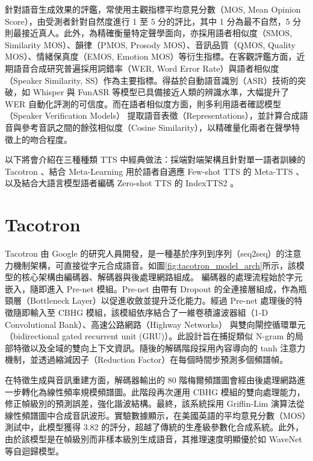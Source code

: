針對語音生成效果的評鑑，常使用主觀指標平均意見分數（MOS, Mean Opinion Score），由受測者針對自然度進行 1 至 5 分的評比，其中 1 分為最不自然，5 分則最接近真人。此外，為精確衡量特定聲學面向，亦採用語者相似度（SMOS, Similarity MOS）、韻律（PMOS, Prosody MOS）、音訊品質（QMOS, Quality MOS）、情緒保真度（EMOS, Emotion MOS）等衍生指標。在客觀評鑑方面，近期語音合成研究普遍採用詞錯率（WER, Word Error Rate）與語者相似度（Speaker Similarity, SS）作為主要指標。得益於自動語音識別（ASR）技術的突破，如 Whisper 與 FunASR 等模型已具備接近人類的辨識水準，大幅提升了 WER 自動化評測的可信度。而在語者相似度方面，則多利用語者確認模型（Speaker Verification Models） 提取語音表徵（Representations），並計算合成語音與參考音訊之間的餘弦相似度（Cosine Similarity），以精確量化兩者在聲學特徵上的吻合程度。


以下將會介紹在三種種類 TTS 中經典做法：採端對端架構且針對單一語者訓練的 Tacotron \cite{wang2017tacotron}、結合 Meta-Learning 用於語者自適應 Few-shot TTS 的 Meta-TTS \cite{huang2022metatts}、以及結合大語言模型語者編碼 Zero-shot TTS 的 IndexTTS2 \cite{zhou2025indextts2}。

\section{Tacotron}


Tacotron 由 Google 的研究人員開發，是一種基於序列到序列（seq2seq）\cite{sutskever2014seq2seq}的注意力機制架構，可直接從字元合成語音。如圖\ref{fig:tacotron_model_arch}所示，該模型的核心架構由編碼器、解碼器與後處理網路組成。 編碼器的處理流程始於字元嵌入，隨即進入 Pre-net 模組。Pre-net 由帶有 Dropout 的全連接層組成，作為瓶頸層（Bottleneck Layer）以促進收斂並提升泛化能力。經過 Pre-net 處理後的特徵隨即輸入至 CBHG 模組，該模組依序結合了一維卷積濾波器組（1-D Convolutional Bank）、高速公路網路（Highway Networks）\cite{srivastava2015highway} 與雙向閘控循環單元（bidirectional gated recurrent unit (GRU)\cite{chung2014empirical}）。此設計旨在捕捉類似 N-gram 的局部特徵以及全域的雙向上下文資訊。隨後的解碼階段採用內容導向的 tanh 注意力機制，並透過縮減因子（Reduction Factor）在每個時間步預測多個頻譜幀。

在特徵生成與音訊重建方面，解碼器輸出的 80 階梅爾頻譜圖會經由後處理網路進一步轉化為線性頻率規模頻譜圖。此階段再次運用 CBHG 模組的雙向處理能力，修正幀級別的預測誤差，強化諧波結構。最終，該系統採用 Griffin-Lim 演算法從線性頻譜圖中合成音訊波形。實驗數據顯示，在美國英語的平均意見分數（MOS）測試中，此模型獲得 3.82 的評分，超越了傳統的生產級參數化合成系統。此外，由於該模型是在幀級別而非樣本級別生成語音，其推理速度明顯優於如 WaveNet 等自迴歸模型。


